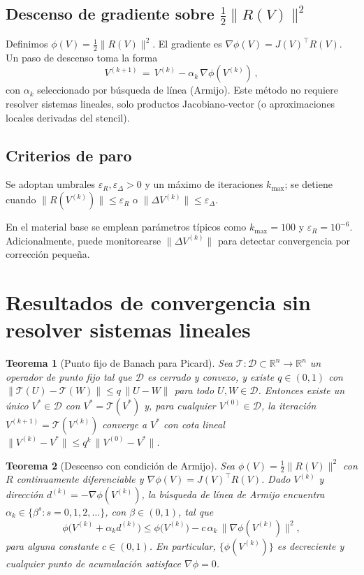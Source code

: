 \documentclass[12pt,letterpaper]{article}
\newtheorem{theorem}{Teorema}
\theoremstyle{definition}
\theoremstyle{remark}
\newcommand{\R}{\mathbb{R}}
\newcommand{\norm}[1]{\lVert #1\rVert}
\begin{document}
\subsection{Descenso de gradiente sobre $\tfrac{1}{2}\norm{R(V)}^2$}
Definimos $\phi(V)=\tfrac{1}{2}\norm{R(V)}^2$. El gradiente es $\nabla\phi(V)=J(V)^\top R(V)$. Un paso de descenso toma la forma
\[
  V^{(k+1)}\,=\,V^{(k)}-\alpha_k\,\nabla\phi(V^{(k)})\,,
\]
con $\alpha_k$ seleccionado por búsqueda de línea (Armijo). Este método no requiere resolver sistemas lineales, solo productos Jacobiano-vector (o aproximaciones locales derivadas del stencil).

\subsection{Criterios de paro}
Se adoptan umbrales $\varepsilon_R,\varepsilon_\Delta>0$ y un máximo de iteraciones $k_{\max}$; se detiene cuando $\norm{R(V^{(k)})}\le \varepsilon_R$ o $\norm{\Delta V^{(k)}}\le\varepsilon_\Delta$.

En el material base se emplean parámetros típicos como $k_{\max}=100$ y $\varepsilon_R=10^{-6}$. Adicionalmente, puede monitorearse $\norm{\Delta V^{(k)}}$ para detectar convergencia por corrección pequeña.

\section{Resultados de convergencia sin resolver sistemas lineales}
\begin{theorem}[Punto fijo de Banach para Picard]
Sea $\mathcal{T}:\mathcal{D}\subset\R^n\to\R^n$ un operador de punto fijo tal que $\mathcal{D}$ es cerrado y convexo, y existe $q\in(0,1)$ con $\norm{\mathcal{T}(U)-\mathcal{T}(W)}\le q\,\norm{U-W}$ para todo $U,W\in\mathcal{D}$. Entonces existe un único $V^\ast\in\mathcal{D}$ con $V^\ast=\mathcal{T}(V^\ast)$ y, para cualquier $V^{(0)}\in\mathcal{D}$, la iteración $V^{(k+1)}=\mathcal{T}(V^{(k)})$ converge a $V^\ast$ con cota lineal $\norm{V^{(k)}-V^\ast}\le q^k\,\norm{V^{(0)}-V^\ast}$.
\end{theorem}

\begin{theorem}[Descenso con condición de Armijo]
Sea $\phi(V)=\tfrac{1}{2}\norm{R(V)}^2$ con $R$ continuamente diferenciable y $\nabla\phi(V)=J(V)^\top R(V)$. Dado $V^{(k)}$ y dirección $d^{(k)}=-\nabla\phi(V^{(k)})$, la búsqueda de línea de Armijo encuentra $\alpha_k\in\{\beta^s: s=0,1,2,\dots\}$, con $\beta\in(0,1)$, tal que
\[
  \phi\big(V^{(k)}+\alpha_k d^{(k)}\big)\le \phi\big(V^{(k)}\big) - c\,\alpha_k\,\norm{\nabla\phi(V^{(k)})}^2,
\]
para alguna constante $c\in(0,1)$. En particular, $\{\phi(V^{(k)})\}$ es decreciente y cualquier punto de acumulación satisface $\nabla\phi=0$.
\end{theorem}
\end{document}
